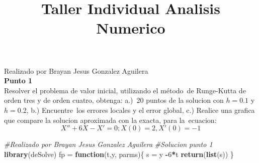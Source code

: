 \documentclass[]{article}
\title{Taller Individual Analisis Numerico}
\author{}
\date{}
\newenvironment{Shaded}{\begin{snugshade}}{\end{snugshade}}
\newcommand{\KeywordTok}[1]{\textcolor[rgb]{0.13,0.29,0.53}{\textbf{#1}}}
\newcommand{\DecValTok}[1]{\textcolor[rgb]{0.00,0.00,0.81}{#1}}
\newcommand{\StringTok}[1]{\textcolor[rgb]{0.31,0.60,0.02}{#1}}
\newcommand{\CommentTok}[1]{\textcolor[rgb]{0.56,0.35,0.01}{\textit{#1}}}
\newcommand{\ControlFlowTok}[1]{\textcolor[rgb]{0.13,0.29,0.53}{\textbf{#1}}}
\newcommand{\OperatorTok}[1]{\textcolor[rgb]{0.81,0.36,0.00}{\textbf{#1}}}
\newcommand{\NormalTok}[1]{#1}
\begin{document}
\maketitle

Realizado por Brayan Jesus Gonzalez
Aguilera\\[2\baselineskip]\textbf{Punto 1}\\[2\baselineskip]Resolver el
problema de valor inicial, utilizando el método~de Runge-Kutta de orden
tres y de orden cuatro, obtenga: a.)~20 puntos de la solucion con
\(h=0.1\) y \(h=0.2\), b.) Encuentre~los errores locales y el error
global, c.) Realice una grafica que compare la solucion aproximada con
la exacta, para la~ecuacion:\\
\[
X''+6X-X'=0; X(0)=2, X'(0)=-1
\]

\begin{Shaded}
\begin{Highlighting}[]
\CommentTok{#Realizado por Brayan Jesus Gonzalez Aguilera}
\CommentTok{#Solucion punto 1}
\KeywordTok{library}\NormalTok{(deSolve)}
\NormalTok{fp =}\StringTok{ }\ControlFlowTok{function}\NormalTok{(t,y, parms)\{}
\NormalTok{  s =}\StringTok{ }\NormalTok{y }\OperatorTok{-}\DecValTok{6}\OperatorTok{*}\NormalTok{t}
  \KeywordTok{return}\NormalTok{(}\KeywordTok{list}\NormalTok{(s))}
\NormalTok{\}}


\end{Highlighting}
\end{Shaded}
\end{document}
